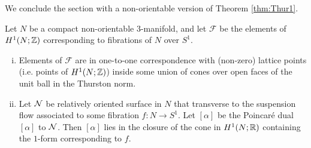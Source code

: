 We conclude the section with a non-orientable version of Theorem \ref{thm:Thur1}.
\begin{thm}
  \label{thm:classifying-fibrations}
  Let $N$ be a compact non-orientable $3$-manifold, and let $\mathcal{F}$ be the elements of $H^1(N; \mathbb{Z})$ corresponding to fibrations of $N$ over $S^1$.
  \begin{enumerate}[(i)]
  \item Elements of $\mathcal{F}$ are in one-to-one correspondence with (non-zero) lattice points (i.e. points of $H^1(N; \mathbb{Z})$) inside some union of cones over open faces of the unit ball in the Thurston norm.
  \item Let $\mathcal{N}$ be relatively oriented surface in $N$ that transverse to the suspension flow associated to some fibration $f: N \to S^1$.  Let $[\alpha]$ be the Poincar\'e dual $[\alpha]$ to $\mathcal{N}$.  Then $[\alpha]$ lies in the closure of the cone in $H^1(N; \mathbb{R})$ containing the $1$-form corresponding to $f$.
  \end{enumerate}
\end{thm}
